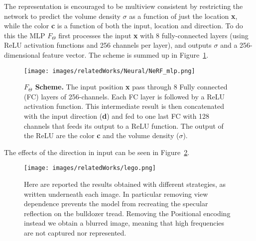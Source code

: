 The representation is encouraged to be multiview consistent by restricting the network to predict the 
volume density $\sigma$ as a function of just the location \textbf{x}, while the color \textbf{c} is a
function of both the input, location and direction. To do this the MLP $F_{\Theta}$ first processes the 
input \textbf{x} with 8 fully-connected layers (using ReLU activation functions and 256 channels per layer),
and outputs $\sigma$ and a 256-dimensional feature vector. The scheme is summed up in Figure~\ref{fig:mlp}.
\begin{figure}
    \centering
    \texttt{[image: images/relatedWorks/Neural/NeRF\_mlp.png]} 
    \caption{\textbf{$F_{\Theta}$ Scheme.} The input position \textbf{x} pass through 8 Fully connected
    (FC) layers of 256-channels. Each FC layer is followed by a ReLU activation function. This intermediate
    result is then concatenated with the input direction (\textbf{d}) and fed to
    one last FC with 128 channels that feeds its output to a ReLU function. The output of the ReLU
    are the color \textbf{c} and the volume density ($\sigma$).}\label{fig:mlp}
\end{figure}

The effects of the direction in input can be seen in Figure~\ref{fig:lego}.
\begin{figure}
    \centering
    \texttt{[image: images/relatedWorks/lego.png]} 
    \caption{Here are reported the results obtained with different strategies, as written underneath each image.
     In particular removing view dependence prevents the model from recreating the specular 
     reflection on the bulldozer tread. Removing the Positional encoding instead we 
     obtain a blurred image, meaning that high frequencies are not captured nor represented.}\label{fig:lego}
\end{figure}

